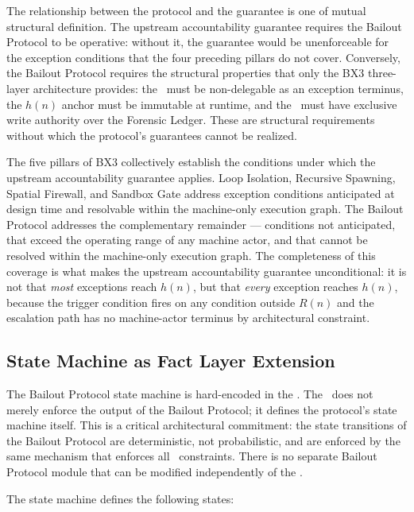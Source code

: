 The relationship between the protocol and the guarantee is one of mutual structural definition. The upstream accountability guarantee requires the Bailout Protocol to be operative: without it, the guarantee would be unenforceable for the exception conditions that the four preceding pillars do not cover. Conversely, the Bailout Protocol requires the structural properties that only the BX3 three-layer architecture provides: the \purpose\ must be non-delegable as an exception terminus, the $h(n)$ anchor must be immutable at runtime, and the \fact\ must have exclusive write authority over the Forensic Ledger. These are structural requirements without which the protocol's guarantees cannot be realized.

The five pillars of BX3 collectively establish the conditions under which the upstream accountability guarantee applies. Loop Isolation, Recursive Spawning, Spatial Firewall, and Sandbox Gate address exception conditions anticipated at design time and resolvable within the machine-only execution graph. The Bailout Protocol addresses the complementary remainder --- conditions not anticipated, that exceed the operating range of any machine actor, and that cannot be resolved within the machine-only execution graph. The completeness of this coverage is what makes the upstream accountability guarantee unconditional: it is not that \emph{most} exceptions reach $h(n)$, but that \emph{every} exception reaches $h(n)$, because the trigger condition fires on any condition outside $R(n)$ and the escalation path has no machine-actor terminus by architectural constraint.

\subsection{State Machine as Fact Layer Extension}
\label{sec:state-machine}

The Bailout Protocol state machine is hard-encoded in the \fact. The \fact\ does not merely enforce the output of the Bailout Protocol; it defines the protocol's state machine itself. This is a critical architectural commitment: the state transitions of the Bailout Protocol are deterministic, not probabilistic, and are enforced by the same mechanism that enforces all \fact\ constraints. There is no separate Bailout Protocol module that can be modified independently of the \fact.

The state machine defines the following states:

